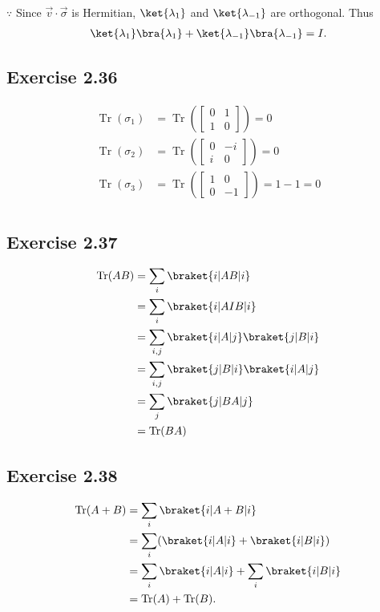 \documentclass[a4paper,12pt]{article}
\DeclareMathOperator{\Tr}{Tr}
\begin{document}
$\because$ Since $\vec{v} \cdot \vec{\sigma}$ is Hermitian, $\ket{\lambda_1}$ and $\ket{\lambda_{-1}}$ are orthogonal.
Thus
\begin{align*}
	\ket{\lambda_1}\bra{\lambda_1} + \ket{\lambda_{-1}}\bra{\lambda_{-1}} = I.
\end{align*}


\subsection*{Exercise 2.36}
\begin{align*}
	\Tr (\sigma_1) &= \Tr \left(
		\begin{bmatrix}
		0 & 1 \\
		1 & 0
		\end{bmatrix}
	\right) = 0\\
%
	\Tr (\sigma_2) &= \Tr \left(
		\begin{bmatrix}
		0 & -i \\
		i & 0
		\end{bmatrix}
	\right) = 0\\
%
	\Tr (\sigma_3) &= \Tr \left(
	\begin{bmatrix}
		1 & 0 \\
		0 & -1
	\end{bmatrix}
	\right) = 1 -1 = 0\\
\end{align*}



\subsection*{Exercise 2.37}
\begin{align*}
	\Tr (AB) &= \sum_i \braket{i | AB | i}\\
		&=\sum_i \braket{i | A I B | i}\\
		&= \sum_{i,j} \braket{i | A | j}\braket{j | B | i}\\
		&= \sum_{i,j} \braket{j | B | i} \braket{i | A | j}\\
		&= \sum_j \braket{j | BA | j}\\
		&= \Tr (BA)
\end{align*}



\subsection*{Exercise 2.38}
\begin{align*}
	\Tr (A + B) &= \sum_i \braket{i | A+B | i}\\
		&= \sum_i (\braket{i|A|i}  + \braket{i | B | i}  )\\
		&= \sum_i \braket{i|A|i} + \sum_i \braket{i|B|i}\\
		&= \Tr (A) + \Tr (B).
\end{align*}
\end{document}
